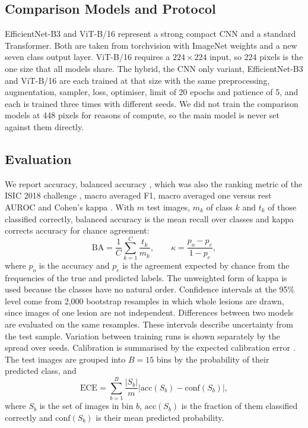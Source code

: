 \documentclass[runningheads]{llncs}
\begin{document}
\subsection{Comparison Models and Protocol}

EfficientNet-B3 \cite{tan2019} and ViT-B/16 \cite{dosovitskiy2021} represent a strong compact CNN and a standard Transformer. Both are taken from torchvision with ImageNet weights and a new seven class output layer. ViT-B/16 requires a $224 \times 224$ input, so 224 pixels is the one size that all models share. The hybrid, the CNN only variant, EfficientNet-B3 and ViT-B/16 are each trained at that size with the same preprocessing, augmentation, sampler, loss, optimiser, limit of 20 epochs and patience of 5, and each is trained three times with different seeds. We did not train the comparison models at 448 pixels for reasons of compute, so the main model is never set against them directly.

\subsection{Evaluation}

We report accuracy, balanced accuracy \cite{brodersen2010}, which was also the ranking metric of the ISIC 2018 challenge \cite{codella2019}, macro averaged F1, macro averaged one versus rest AUROC and Cohen's kappa \cite{cohen1960}. With $m$ test images, $m_k$ of class $k$ and $t_k$ of those classified correctly, balanced accuracy is the mean recall over classes and kappa corrects accuracy for chance agreement:
\begin{equation}
\mathrm{BA} = \frac{1}{C} \sum_{k=1}^{C} \frac{t_k}{m_k}, \qquad \kappa = \frac{p_o - p_e}{1 - p_e},
\label{eq:metrics}
\end{equation}
where $p_o$ is the accuracy and $p_e$ is the agreement expected by chance from the frequencies of the true and predicted labels. The unweighted form of kappa is used because the classes have no natural order. Confidence intervals at the 95\% level come from 2,000 bootstrap resamples \cite{efron1993} in which whole lesions are drawn, since images of one lesion are not independent. Differences between two models are evaluated on the same resamples. These intervals describe uncertainty from the test sample. Variation between training runs is shown separately by the spread over seeds. Calibration is summarised by the expected calibration error \cite{guo2017}. The test images are grouped into $B = 15$ bins by the probability of their predicted class, and
\begin{equation}
\mathrm{ECE} = \sum_{b=1}^{B} \frac{|S_b|}{m} \left| \mathrm{acc}(S_b) - \mathrm{conf}(S_b) \right|,
\label{eq:ece}
\end{equation}
where $S_b$ is the set of images in bin $b$, $\mathrm{acc}(S_b)$ is the fraction of them classified correctly and $\mathrm{conf}(S_b)$ is their mean predicted probability.
\end{document}
